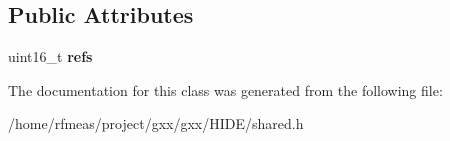 \subsection*{Public Attributes}
\begin{DoxyCompactItemize}
\item 
uint16\+\_\+t {\bfseries refs}\hypertarget{classgxx_1_1shared__control__block_acc385a3f14df03a6d7cf682821fd9d2a}{}\label{classgxx_1_1shared__control__block_acc385a3f14df03a6d7cf682821fd9d2a}

\end{DoxyCompactItemize}


The documentation for this class was generated from the following file\+:\begin{DoxyCompactItemize}
\item 
/home/rfmeas/project/gxx/gxx/\+H\+I\+D\+E/shared.\+h\end{DoxyCompactItemize}
